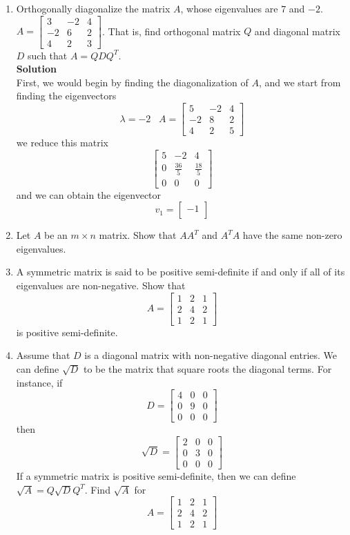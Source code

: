 \documentclass[12pt]{article}
\begin{document}
\begin{enumerate}


 \item Orthogonally diagonalize the matrix $A$, whose eigenvalues are $7$ and $-2$. $A=\begin{bmatrix} 3 & -2 & 4 \\ -2 & 6 & 2 \\ 4 & 2 & 3 \end{bmatrix}$.  That is, find orthogonal matrix $Q$ and diagonal matrix $D$ such that $A = Q D Q^{T}$. 
\\
\textbf{Solution}\\
First, we would begin by finding the diagonalization of $A$, and we start from finding the eigenvectors
\[
\lambda = -2 \;\;\; 
A=\begin{bmatrix} 
5 & -2 & 4 \\ 
-2 & 8 & 2 \\ 
4 & 2 & 5 
\end{bmatrix}
\]
we reduce this matrix
\[
\begin{bmatrix}
5 & -2 & 4 \\
0 & \frac{36}{5} & \frac{18}{5} \\
0 & 0 & 0
\end{bmatrix}
\]
and we can obtain the eigenvector
\[
v_1 = \begin{bmatrix}
    -1\\
\end{bmatrix}
\]

 

\item Let $A$ be an $m \times n$ matrix.  Show that $AA^{T}$ and $A^{T}A$ have the same non-zero eigenvalues.  

\item A symmetric matrix is said to be positive semi-definite if and only if all of its eigenvalues are non-negative.  Show that 
\[
A  =  \begin{bmatrix} 1 & 2 & 1   \\ 2 & 4 & 2  \\ 1 & 2 & 1   \end{bmatrix} 
\]
is positive semi-definite.

\item Assume that $D$ is a diagonal matrix with non-negative diagonal entries.  We can define $\sqrt{D}$ to be the matrix that square roots the diagonal terms.  For instance, if 
\[
D = \begin{bmatrix} 4 & 0 & 0  \\ 0 & 9 & 0 \\ 0 & 0 & 0 \end{bmatrix} 
\]
then 
\[
\sqrt{D} = \begin{bmatrix} 2 & 0 & 0  \\ 0 & 3 & 0 \\ 0 & 0 & 0 \end{bmatrix} 
\]
If a symmetric matrix is positive semi-definite, then we can define $\sqrt{A} = Q \sqrt{D} Q^{T}$. Find $\sqrt{A}$ for 
\[
A  =  \begin{bmatrix} 1 & 2 & 1   \\ 2 & 4 & 2  \\ 1 & 2 & 1   \end{bmatrix} 
\]


\end{enumerate}
\end{document}

